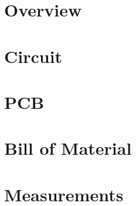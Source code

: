 




	\raggedbottom
	\maketitle
	
	

	\tableofcontents
	
	\chapter{Overview}
	\label{chp:overview}
	
	
	\chapter{Circuit}
	\label{chp:circuit}
	
	
	
	\chapter{PCB}
	\label{chp:pcb}
	
	
	\chapter{Bill of Material}
	\label{chp:bom}
	
	
	\chapter{Measurements}
	\label{chp:measurements}
	
	
